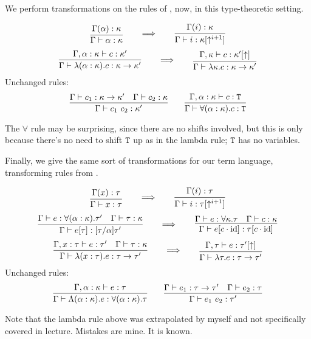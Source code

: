 \begin{enumerate}[1.]
We perform transformations on the rules of , now, in this type-theoretic setting.
\begin{judgment}
  \[
    \vcenter{ \infer{\Gamma \vdash \alpha : \kappa}{\Gamma(\alpha) : \kappa} }
    \qquad
    \Longrightarrow
    \qquad
    \vcenter{ \infer{\Gamma \vdash i : \kappa[\uparrow^{i+1}]}{\Gamma(i) : \kappa} }
  \]
  \[
    \vcenter{
      \infer{\Gamma \vdash \lambda(\alpha : \kappa).c : \kappa \to \kappa'}
            {\Gamma, \alpha : \kappa \vdash c : \kappa'}
    }
    \qquad
    \Longrightarrow
    \qquad
    \vcenter{
      \infer{\Gamma \vdash \lambda \kappa. c : \kappa \rightarrow \kappa'}
           {\Gamma, \kappa \vdash c : \kappa'[\uparrow]}
    }
  \]
  Unchanged rules:
  \[
  \infer{\Gamma \vdash c_1 ~ c_2 : \kappa'}
        {\Gamma \vdash c_1 : \kappa \rightarrow \kappa'
        &\Gamma \vdash c_2 : \kappa
        }
  \qquad
  \infer{\Gamma \vdash \forall(\alpha : \kappa).c : \T}
        {\Gamma, \alpha : \kappa \vdash c : \T}
  \]
\end{judgment}
The $\forall$ rule may be surprising, since there are no shifts involved, but this is only
because there's no need to shift $\mathtt{T}$ up as in the lambda rule; $\mathtt{T}$ has no variables.

Finally, we give the same sort of transformations for our term language, transforming
rules from .
\begin{judgment}
  \[
    \vcenter{ \infer{\Gamma \vdash x : \tau}{\Gamma(x) : \tau} }
    \qquad
    \Longrightarrow
    \qquad
    \vcenter{ \infer{\Gamma \vdash i : \tau[\uparrow^{i+1}]}{\Gamma(i) : \tau} }
  \]
  \[
    \vcenter{
      \infer{\Gamma \vdash e[\tau] : [\tau / \alpha]\tau'}
          {\Gamma \vdash e : \forall(\alpha : \kappa).\tau'
          &\Gamma \vdash \tau : \kappa
          }
    }
    \qquad
    \Longrightarrow
    \qquad
    \vcenter{
      \infer{\Gamma \vdash e[c \cdot \id] : \tau [c \cdot \id]}
        {\Gamma \vdash e : \forall \kappa. \tau
        & \Gamma \vdash c : \kappa
        }
    }
  \]
  \[
    \vcenter{
      \infer{\Gamma \vdash \lambda(x : \tau).e : \tau \rightarrow \tau'}
            {\Gamma, x : \tau \vdash e : \tau'
            &\Gamma \vdash \tau : \kappa
            }
    }
    \qquad
    \Longrightarrow
    \qquad
    \vcenter{
      \infer{\Gamma \vdash \lambda \tau. e : \tau \rightarrow \tau'}
           {\Gamma, \tau \vdash e : \tau'[\uparrow]}
    }
  \]
  Unchanged rules:
  \[
    \infer{\Gamma \vdash \Lambda (\alpha : \kappa).e : \forall (\alpha : \kappa).\tau}
          {\Gamma, \alpha : \kappa \vdash e : \tau}
    \qquad
    \infer{\Gamma \vdash e_1 ~ e_2 : \tau'}
          {\Gamma \vdash e_1 : \tau \rightarrow \tau'
          &\Gamma \vdash e_2 : \tau
          }
  \]
\end{judgment}

Note that the lambda rule above was extrapolated by myself and not specifically covered
in lecture. Mistakes are mine. It is known.

\end{enumerate}
